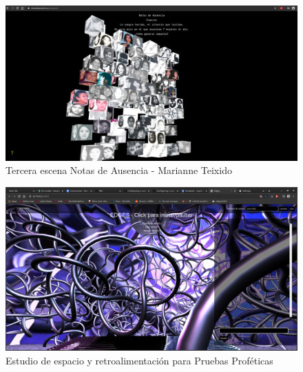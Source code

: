 \begin{figure}
  \includegraphics[width=\textwidth]{img/notas04.png}
  \caption{Tercera escena Notas de Ausencia - Marianne Teixido}
\end{figure}




\begin{figure}
  \includegraphics[width=\textwidth]{img/pruebas3.png}
  \caption{Estudio de espacio y retroalimentación para Pruebas Proféticas}
\end{figure}


